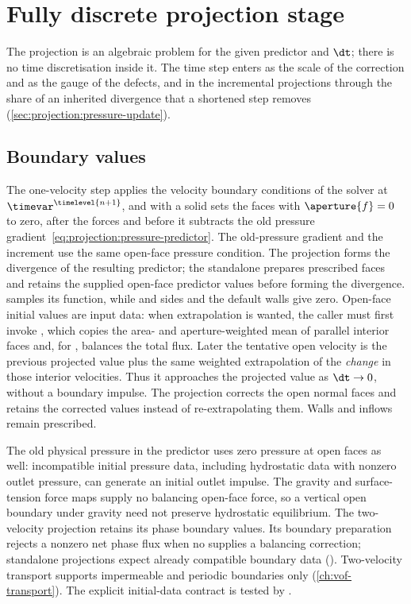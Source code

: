 \section{Fully discrete projection stage}\label{sec:projection:time}
The projection is an algebraic problem for the given predictor and $\dt$;
there is no time discretisation inside it. The time step enters as the scale
of the correction and as the gauge of the defects, and in the incremental
projections through the share of an inherited divergence that a shortened
step removes (\cref{sec:projection:pressure-update}).

\subsection{Boundary values}\label{sec:projection:stage}
The one-velocity step applies the velocity boundary conditions of the solver
at $\timevar^{\timelevel{n+1}}$, and with a solid sets the faces with
$\aperture{f}=0$ to zero, after the forces and before it subtracts the old
pressure gradient~\cref{eq:projection:pressure-predictor}. The old-pressure
gradient and the increment use the same open-face pressure condition. The
projection forms the divergence of the resulting predictor; the standalone
 prepares prescribed faces and retains the supplied open-face
predictor values before forming the divergence.
 samples its function, while  and
 sides and the default walls give zero. Open-face initial
values are input data: when extrapolation is wanted, the caller must first
invoke , which copies the area- and
aperture-weighted mean of parallel interior faces and, for ,
balances the total flux. Later the tentative open velocity is the previous
projected value plus the same weighted extrapolation of the \emph{change} in
those interior velocities. Thus it approaches the projected value as
$\dt\to0$, without a boundary impulse. The projection corrects the open
normal faces and retains the corrected values instead of re-extrapolating
them. Walls and inflows remain prescribed.

The old physical pressure in the predictor uses zero pressure at open faces
as well: incompatible initial pressure data, including hydrostatic data with
nonzero outlet pressure, can generate an initial outlet impulse. The gravity
and surface-tension force maps supply no balancing open-face force, so a
vertical open boundary under gravity need not preserve hydrostatic
equilibrium. The two-velocity projection retains its phase boundary values.
Its boundary preparation rejects a nonzero net phase flux when no
 supplies a balancing correction; standalone projections
expect already compatible boundary data
().
Two-velocity transport supports impermeable and periodic boundaries only
(\cref{ch:vof-transport}).
The explicit initial-data contract is tested by
.

